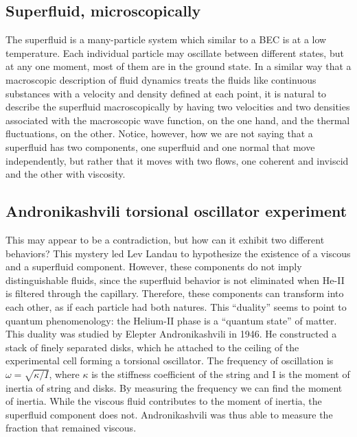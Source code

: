 \documentclass{article}
\begin{document}
\subsection{Superfluid, microscopically}

The superfluid is a many-particle system which similar to a BEC is at a low temperature.  Each individual particle may oscillate between different states, but at any one moment, most of them are in the ground state.  In a similar way that a macroscopic description of fluid dynamics treats the fluids like continuous substances with a velocity and density defined at each point, it is natural to describe the superfluid macroscopically by having two velocities and two densities associated with the macroscopic wave function, on the one hand, and the thermal fluctuations, on the other.  Notice, however, how we are not saying that a superfluid has two components, one superfluid and one normal that move independently, but rather that it moves with two flows, one coherent and inviscid and the other with viscosity.

\subsection{Andronikashvili torsional oscillator experiment}

This may appear to be a contradiction, but how can it exhibit two different behaviors? This mystery led Lev Landau to hypothesize the existence of a viscous and a superfluid component. However, these components do not imply distinguishable fluids, since the superfluid behavior is not eliminated when He-II is filtered through the capillary. Therefore, these components can transform into each other, as if each particle had both natures. This “duality” seems to point to quantum phenomenology: the Helium-II phase is a “quantum state” of matter.
\\

This duality was studied by Elepter Andronikashvili in 1946. He constructed a stack of finely separated disks, which he attached to the ceiling of the experimental cell forming a torsional oscillator. The frequency of oscillation is $\omega = \sqrt{\kappa/I}$, where $\kappa$ is the stiffness coefficient of the string and I is the moment of inertia of string and disks. By measuring the frequency we can find the moment of inertia. While the viscous fluid contributes to the moment of inertia, the superfluid component does not. Andronikashvili was thus able to measure the fraction that remained viscous.
\\
\end{document}
